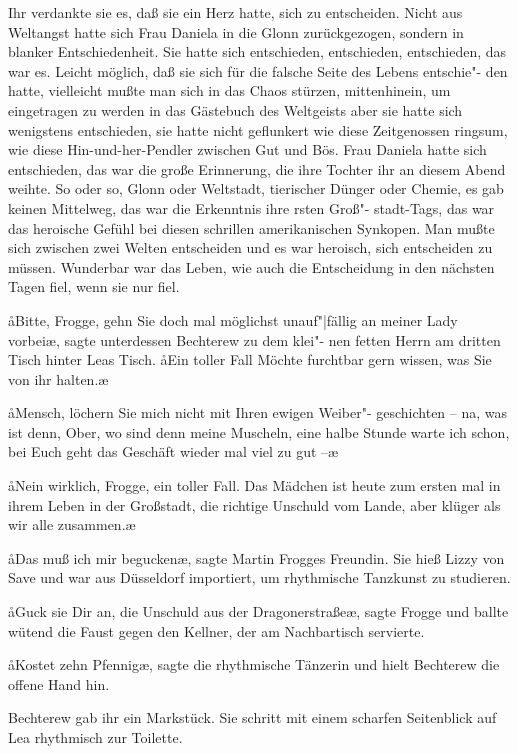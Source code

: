 Ihr verdankte sie es, daß sie ein Herz hatte, sich zu entscheiden.
Nicht aus Weltangst hatte sich Frau Daniela in die Glonn
zurückgezogen, sondern in blanker Entschiedenheit. Sie hatte
sich entschieden, entschieden, entschieden, das war es. Leicht
möglich, daß sie sich für die falsche Seite des Lebens entschie"-%
den hatte, vielleicht mußte man sich in das Chaos stürzen,
mittenhinein, um eingetragen zu werden in das Gästebuch
des Weltgeists\dopp{} aber sie hatte sich wenigstens entschieden, sie
hatte nicht geflunkert wie diese Zeitgenossen ringsum, wie
diese Hin-und-her-Pendler zwischen Gut und Bös. Frau
Daniela hatte sich entschieden, das war die große Erinnerung,
die ihre Tochter ihr an diesem Abend weihte. So oder so,
Glonn oder Weltstadt, tierischer Dünger oder Chemie, es gab
keinen Mittelweg, das war die Erkenntnis ihre rsten Groß"-%
stadt-Tags, das war das heroische Gefühl bei diesen schrillen
amerikanischen Synkopen. Man mußte sich zwischen zwei
Welten entscheiden und es war heroisch, sich entscheiden zu
müssen. Wunderbar war das Leben, wie auch die Entscheidung
in den nächsten Tagen fiel, wenn sie nur fiel.

\aa{}Bitte, Frogge, gehn Sie doch mal möglichst unauf"|fällig an
meiner Lady vorbei\ae{}, sagte unterdessen Bechterew zu dem klei"-%
nen fetten Herrn am dritten Tisch hinter Leas Tisch. \aa{}Ein toller
Fall\ausr{} Möchte furchtbar gern wissen, was Sie von ihr halten.\ae{}

\aa{}Mensch, löchern Sie mich nicht mit Ihren ewigen Weiber"-%
geschichten -- na, was ist denn, Ober, wo sind denn meine
Muscheln, eine halbe Stunde warte ich schon, bei Euch geht
das Geschäft wieder mal viel zu gut --\ae{}

\aa{}Nein wirklich, Frogge, ein toller Fall. Das Mädchen ist heute
zum ersten mal in ihrem Leben in der Großstadt, die richtige
Unschuld vom Lande, aber klüger als wir alle zusammen.\ae{}

\aa{}Das muß ich mir begucken\ae{}, sagte Martin Frogges Freundin.
Sie hieß Lizzy von Save und war aus Düsseldorf importiert,
um rhythmische Tanzkunst zu studieren.

\aa{}Guck sie Dir an, die Unschuld aus der Dragonerstraße\ae{},
sagte Frogge und ballte wütend die Faust gegen den Kellner,
der am Nachbartisch servierte.

\aa{}Kostet zehn Pfennig\ae{}, sagte die rhythmische Tänzerin und
hielt Bechterew die offene Hand hin.

Bechterew gab ihr ein Markstück. Sie schritt mit einem
scharfen Seitenblick auf Lea rhythmisch zur Toilette.

